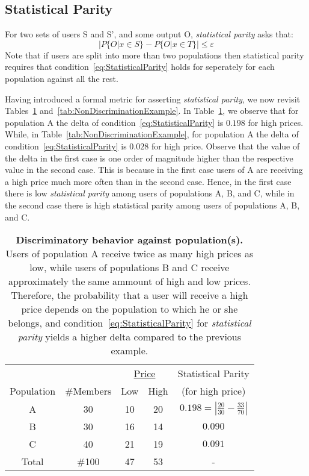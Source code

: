 \subsection{Statistical Parity}
\label{sect:statparity}

For two sets of users S and S', and some output O, {\em statistical parity}
asks that:
\begin{equation}
|P\{O | x \in S\} - P\{O | x \in T\}| \le \varepsilon
\label{eq:StatisticalParity}
\end{equation}
Note that if users are split into more than two populations then statistical
parity requires that condition~\ref{eq:StatisticalParity} holds for seperately
for each population against all the rest.

Having introduced a formal metric for asserting {\em statistical parity}, we now
revisit Tables~\ref{tab:DiscriminationExample}
and~\ref{tab:NonDiscriminationExample}.
In Table~\ref{tab:DiscriminationExample}, we observe that for population A the
delta of condition~\ref{eq:StatisticalParity} is $0.198$ for high prices.
While, in Table~\ref{tab:NonDiscriminationExample}, for population A the delta
of condition~\ref{eq:StatisticalParity} is $0.028$ for high price. Observe that
the value of the delta in the first case is one order of magnitude higher than
the respective value in the second case. This is because in the first case
users of A are receiving a high price much more often than in the second case.
Hence, in the first case there is low {\em statistical parity} among users of
populations A, B, and C, while in the second case there is high statistical
parity among users of populations A, B, and C.

\begin{table}[t]
{
 \scriptsize
  \renewcommand{\arraystretch}{1.5}
  \begin{tabular}{ c | c | c  c | c }
    & & \multicolumn{2}{|c|}{\underline{Price}} &  Statistical Parity\\
    Population & \#Members & Low & High & (for high price) \\
    \hline
    A & 30 &  10 & 20 & $0.198 = | \frac{20}{30} - \frac{33}{70}|$ \\
    B & 30 &  16 & 14 & $0.090$ \\
    C & 40 &  21 & 19 & $0.091$ \\
    \hline
    Total & \#100 & 47 & 53 & - \\
  \end{tabular}
  \caption{{\bf Discriminatory behavior against population(s).} Users of
    population A receive twice as many high prices as low, while users of
    populations B and C receive approximately the same ammount of high and low
    prices. Therefore, the probability that a user will receive a high price
    depends on the population to which he or she belongs, and
    condition~\ref{eq:StatisticalParity} for {\em statistical parity} yields a
    higher delta compared to the previous example.
  }
  \label{tab:DiscriminationExample}
}
\end{table}

